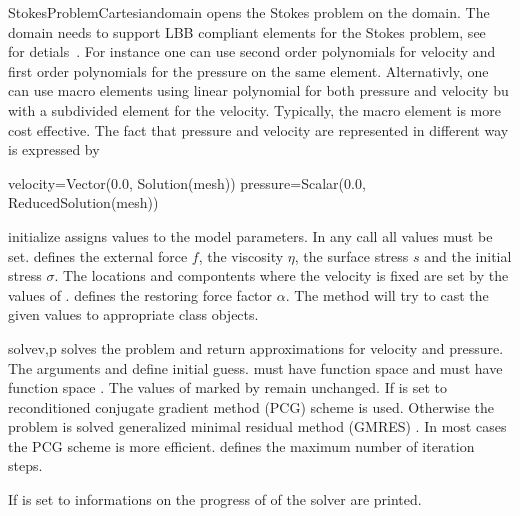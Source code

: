 \begin{classdesc}{StokesProblemCartesian}{domain}
opens the Stokes problem on the \Domain domain. The domain
needs to support LBB compliant elements for the Stokes problem, see~\cite{LBB} for detials~.
For instance one can use second order polynomials for velocity and 
first order polynomials for the pressure on the same element. Alternativly, one can use 
macro elements using linear polynomial for both pressure and velocity bu with a subdivided
element for the velocity. Typically, the macro element is more cost effective. The fact that pressure and velocity are represented in different way is expressed by
\begin{python}
velocity=Vector(0.0, Solution(mesh))
pressure=Scalar(0.0, ReducedSolution(mesh))
\end{python}
\end{classdesc}

\begin{methoddesc}[StokesProblemCartesian]{initialize}{}
assigns values to the model parameters. In any call all values must be set.
 defines the external force $f$,  the viscosity $\eta$,
 the surface stress $s$ and  the initial stress $\sigma$.
The locations and compontents where the velocity is fixed are set by 
the values of .  defines the restoring force factor $\alpha$. 
The method will try to cast the given values to appropriate 
\Data class objects.
\end{methoddesc}

\begin{methoddesc}[StokesProblemCartesian]{solve}{v,p
}
solves the problem and return approximations for velocity and pressure. 
The arguments  and  define initial guess.
 must have function space  and
 must have function space .
The values of  marked
by  remain unchanged. 
If  is set to \True 
reconditioned conjugate gradient method (PCG)   scheme is used. Otherwise the problem is solved generalized minimal residual method (GMRES) . In most cases 
the PCG scheme is more efficient.
 defines the maximum number of iteration steps. 

If  is set to \True informations on the progress of of the solver are printed.
\end{methoddesc}


